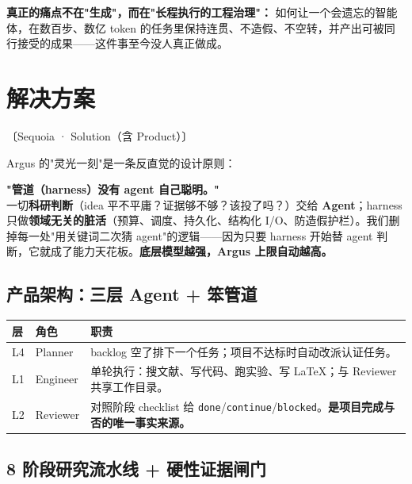 \documentclass[UTF8,11pt,fontset=none]{ctexart}
\newcommand{\thd}[1]{\textbf{\color{white}#1}}
\newcommand{\headrow}{\rowcolor{argusnavy}}
\newcommand{\altrow}{\rowcolor{arguslight}}
\newcommand{\sq}[1]{\hfill{\sffamily\footnotesize\color{argusgray}〔Sequoia · #1〕}}
\begin{document}
\begin{quotebox}
\textbf{真正的痛点不在"生成"，而在"长程执行的工程治理"：} 如何让一个会遗忘的智能体，在数百步、数亿 token 的任务里保持连贯、不造假、不空转，并产出可被同行接受的成果——这件事至今没人真正做成。
\end{quotebox}

\section{解决方案}\sq{Solution（含 Product）}

Argus 的"灵光一刻"是一条反直觉的设计原则：

\begin{keybox}
\textbf{"管道（harness）没有 agent 自己聪明。"}\\[4pt]
一切\textbf{科研判断}（idea 平不平庸？证据够不够？该投了吗？）交给 \textbf{Agent}；harness 只做\textbf{领域无关的脏活}（预算、调度、持久化、结构化 I/O、防造假护栏）。我们删掉每一处"用关键词二次猜 agent"的逻辑——因为只要 harness 开始替 agent 判断，它就成了能力天花板。\textbf{底层模型越强，Argus 上限自动越高。}
\end{keybox}

\subsection{产品架构：三层 Agent + 笨管道}

\begin{tabularx}{\textwidth}{@{}l l X@{}}
\toprule
\headrow \thd{层} & \thd{角色} & \thd{职责} \\
\midrule
\altrow L4 & Planner & backlog 空了排下一个任务；项目不达标时自动改派认证任务。 \\
L1 & Engineer & 单轮执行：搜文献、写代码、跑实验、写 LaTeX；与 Reviewer 共享工作目录。 \\
\altrow L2 & Reviewer & 对照阶段 checklist 给 \texttt{done}/\texttt{continue}/\texttt{blocked}。\textbf{是项目完成与否的唯一事实来源。} \\
\bottomrule
\end{tabularx}

\subsection{8 阶段研究流水线 + 硬性证据闸门}
\end{document}
